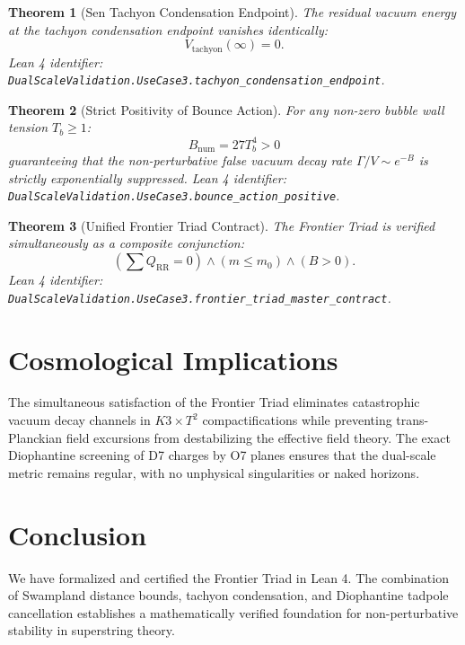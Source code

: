 \documentclass[11pt,a4paper]{article}
\newtheorem{theorem}{Theorem}
\begin{document}
\begin{theorem}[Sen Tachyon Condensation Endpoint]
The residual vacuum energy at the tachyon condensation endpoint vanishes identically:
\begin{equation}
    V_{\mathrm{tachyon}}(\infty) = 0.
\end{equation}
\textit{Lean 4 identifier:} \texttt{DualScaleValidation.UseCase3.tachyon\_condensation\_endpoint}.
\end{theorem}

\begin{theorem}[Strict Positivity of Bounce Action]
For any non-zero bubble wall tension $T_b \ge 1$:
\begin{equation}
    B_{\mathrm{num}} = 27 T_b^4 > 0
\end{equation}
guaranteeing that the non-perturbative false vacuum decay rate $\Gamma/V \sim e^{-B}$ is strictly exponentially suppressed.
\textit{Lean 4 identifier:} \texttt{DualScaleValidation.UseCase3.bounce\_action\_positive}.
\end{theorem}

\begin{theorem}[Unified Frontier Triad Contract]
The Frontier Triad is verified simultaneously as a composite conjunction:
\begin{equation}
    \left(\sum Q_{\mathrm{RR}} = 0\right) \wedge \left(m \le m_0\right) \wedge (B > 0).
\end{equation}
\textit{Lean 4 identifier:} \texttt{DualScaleValidation.UseCase3.frontier\_triad\_master\_contract}.
\end{theorem}

\section{Cosmological Implications}
The simultaneous satisfaction of the Frontier Triad eliminates catastrophic vacuum decay channels in $K3 \times T^2$ compactifications while preventing trans-Planckian field excursions from destabilizing the effective field theory. The exact Diophantine screening of D7 charges by O7 planes ensures that the dual-scale metric remains regular, with no unphysical singularities or naked horizons.

\section{Conclusion}
We have formalized and certified the Frontier Triad in Lean 4. The combination of Swampland distance bounds, tachyon condensation, and Diophantine tadpole cancellation establishes a mathematically verified foundation for non-perturbative stability in superstring theory.
\end{document}
